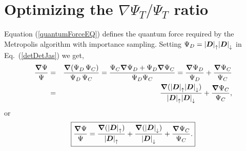 \section{Optimizing the $\nabla \Psi_T / \Psi_T$ ratio}\label{gradToDetRatio}
Equation (\ref{quantumForceEQ}) defines the quantum force required by the Metropolis algorithm with importance sampling. 
Setting $\Psi_D = {|\boldsymbol{D}|}_{\uparrow} {|\boldsymbol{D}|}_{\downarrow}$ in Eq.~(\ref{detDetJas}) we get,
\begin{eqnarray}
\frac{\boldsymbol{\nabla}{\Psi}}{\Psi} & = &\frac{\boldsymbol{\nabla}{(}\Psi_{D} \, \Psi_{C})}{\Psi_{D} \, \Psi_{C}}  =  \frac{ \Psi_C \boldsymbol{\nabla}{\Psi}_{D} + \Psi_{D} \boldsymbol{\nabla}{\Psi}_{C}}{\Psi_{D} \Psi_{C}} = \frac{\boldsymbol{\nabla}{\Psi}_{D}}{\Psi_{D}} + \frac{\boldsymbol{\nabla}{\Psi}_C}{ \Psi_C}\nonumber\\ & = & \frac{\boldsymbol{\nabla}{(}{|\boldsymbol{D}|}_{\uparrow} {|\boldsymbol{D}|}_{\downarrow})}{{|\boldsymbol{D}|}_{\uparrow} {|\boldsymbol{D}|}_{\downarrow}} + \frac{\boldsymbol{\nabla}{\Psi}_C}{ \Psi_C}\nonumber,
\end{eqnarray}
or 
\begin{equation}\label{grad_det_ratio_gen}
\boxed{\frac{\boldsymbol{\nabla}{\Psi}}{\Psi} =  \frac{\boldsymbol{\nabla}{(}{|\boldsymbol{D}|}_{\uparrow}) }{{|\boldsymbol{D}|}_{\uparrow}} + \frac{\boldsymbol{\nabla}{(}{|\boldsymbol{D}|}_{\downarrow})}{{|\boldsymbol{D}|}_{\downarrow}} + \frac{\boldsymbol{\nabla}{\Psi}_C}{ \Psi_C}.}
\end{equation}


